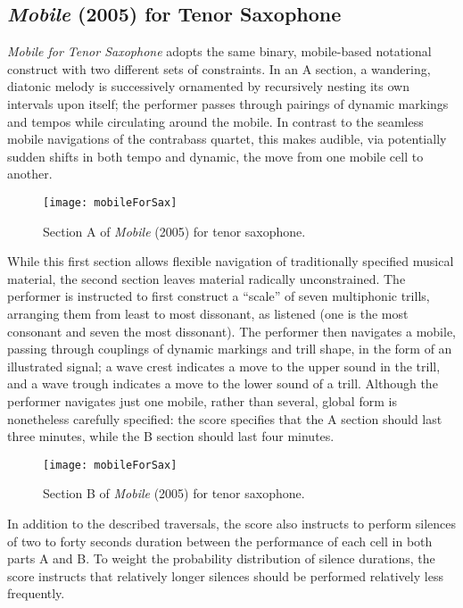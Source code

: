 \subsection{\emph{Mobile} (2005) for Tenor Saxophone}

\emph{Mobile for Tenor Saxophone} adopts the same binary, mobile-based notational construct with two different sets of constraints. In an A section, a wandering, diatonic melody is successively ornamented by recursively nesting its own intervals upon itself; the performer passes through pairings of dynamic markings and tempos while circulating around the mobile. In contrast to the seamless mobile navigations of the contrabass quartet, this makes audible, via potentially sudden shifts in both tempo and dynamic, the move from one mobile cell to another. 

\begin{figure}[H] 
\texttt{[image: mobileForSax]}
\caption{Section A of \emph{Mobile} (2005) for tenor saxophone. } 
\end{figure}

While this first section allows flexible navigation of traditionally specified musical material, the second section leaves material radically unconstrained. The performer is instructed to first construct a ``scale'' of seven multiphonic trills, arranging them from least to most dissonant, as listened (one is the most consonant and seven the most dissonant). The performer then navigates a mobile, passing through couplings of dynamic markings and trill shape, in the form of an illustrated signal; a wave crest indicates a move to the upper sound in the trill, and a wave trough indicates a move to the lower sound of a trill.
Although the performer navigates just one mobile, rather than several, global form is nonetheless carefully specified: the score specifies that the A section should last three minutes, while the B section should last four minutes.

\begin{figure}[H] 
\texttt{[image: mobileForSax]}
\caption{Section B of \emph{Mobile} (2005) for tenor saxophone. } 
\end{figure}

In addition to the described traversals, the score also instructs to perform silences of two to forty seconds duration between the performance of each cell in both parts A and B. To weight the probability distribution of silence durations, the score instructs that relatively longer silences should be performed relatively less frequently. 

